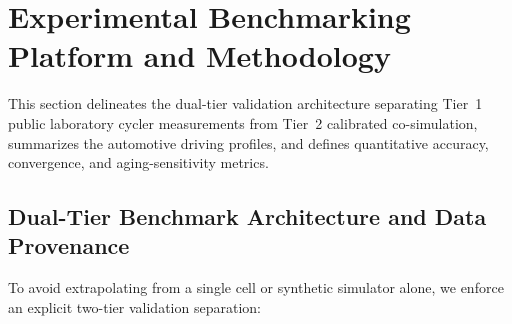 \documentclass[11pt,a4paper]{article}
\begin{document}
\section{Experimental Benchmarking Platform and Methodology\label{sec:exp_setup}}
This section delineates the dual-tier validation architecture separating Tier~1 public laboratory cycler measurements from Tier~2 calibrated co-simulation, summarizes the automotive driving profiles, and defines quantitative accuracy, convergence, and aging-sensitivity metrics.

\subsection{Dual-Tier Benchmark Architecture and Data Provenance}
To avoid extrapolating from a single cell or synthetic simulator alone, we enforce an explicit two-tier validation separation:
\end{document}
